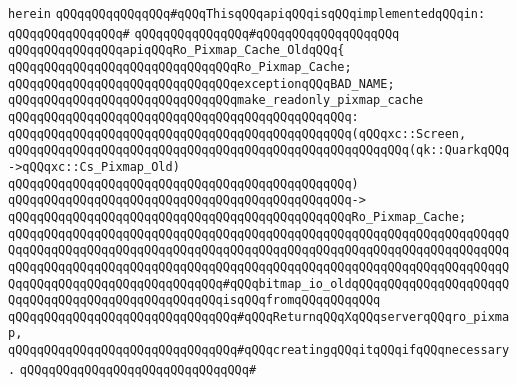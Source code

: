 \verb|herein|\newline
\newline
\verb|qQQqqQQqqQQqqQQq#qQQqThisqQQqapiqQQqisqQQqimplementedqQQqin:|\newline
\verb|qQQqqQQqqQQqqQQq#|\newline
\verb|qQQqqQQqqQQqqQQq#qQQqqQQqqQQqqQQqqQQq|\newline
\newline
\verb|qQQqqQQqqQQqqQQqapiqQQqRo_Pixmap_Cache_OldqQQq{|\newline
\newline
\verb|qQQqqQQqqQQqqQQqqQQqqQQqqQQqqQQqRo_Pixmap_Cache;|\newline
\newline
\verb|qQQqqQQqqQQqqQQqqQQqqQQqqQQqqQQqexceptionqQQqBAD_NAME;|\newline
\newline
\verb|qQQqqQQqqQQqqQQqqQQqqQQqqQQqqQQqmake_readonly_pixmap_cache|\newline
\verb|qQQqqQQqqQQqqQQqqQQqqQQqqQQqqQQqqQQqqQQqqQQqqQQq:|\newline
\verb|qQQqqQQqqQQqqQQqqQQqqQQqqQQqqQQqqQQqqQQqqQQqqQQq(qQQqxc::Screen,|\newline
\verb|qQQqqQQqqQQqqQQqqQQqqQQqqQQqqQQqqQQqqQQqqQQqqQQqqQQqqQQq(qk::QuarkqQQq->qQQqxc::Cs_Pixmap_Old)|\newline
\verb|qQQqqQQqqQQqqQQqqQQqqQQqqQQqqQQqqQQqqQQqqQQqqQQq)|\newline
\verb|qQQqqQQqqQQqqQQqqQQqqQQqqQQqqQQqqQQqqQQqqQQqqQQq->|\newline
\verb|qQQqqQQqqQQqqQQqqQQqqQQqqQQqqQQqqQQqqQQqqQQqqQQqRo_Pixmap_Cache;|\newline
\verb|qQQqqQQqqQQqqQQqqQQqqQQqqQQqqQQqqQQqqQQqqQQqqQQqqQQqqQQqqQQqqQQqqQQqqQQqqQQqqQQqqQQqqQQqqQQqqQQqqQQqqQQqqQQqqQQqqQQqqQQqqQQqqQQqqQQqqQQqqQQqqQQqqQQqqQQqqQQqqQQqqQQqqQQqqQQqqQQqqQQqqQQqqQQqqQQqqQQqqQQqqQQqqQQqqQQqqQQqqQQqqQQqqQQqqQQqqQQqqQQq#qQQqbitmap_io_oldqQQqqQQqqQQqqQQqqQQqqQQqqQQqqQQqqQQqqQQqqQQqqQQqqQQqisqQQqfromqQQqqQQqqQQq|\newline
\verb|qQQqqQQqqQQqqQQqqQQqqQQqqQQqqQQq#qQQqReturnqQQqXqQQqserverqQQqro_pixmap,|\newline
\verb|qQQqqQQqqQQqqQQqqQQqqQQqqQQqqQQq#qQQqcreatingqQQqitqQQqifqQQqnecessary.|\newline
\verb|qQQqqQQqqQQqqQQqqQQqqQQqqQQqqQQq#|\newline

